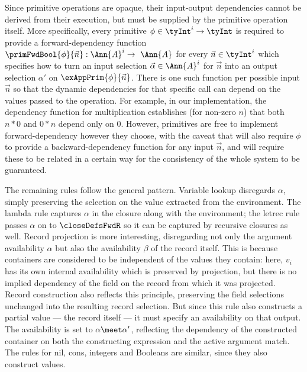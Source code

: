  Since primitive operations are opaque, their input-output dependencies cannot be derived from their execution, but must be supplied by the primitive operation itself. More specifically, every primitive $\phi \in \tyInt^{i} \to \tyInt$ is required to provide a forward-dependency function $\primFwdBool{\phi}{\vec{n}}: \Ann{A}^i \to \Ann{A}$ for every $\vec{n} \in \tyInt^i$ which specifies how to turn an input selection $\vec{\alpha} \in \Ann{A}^i$ for $\vec{n}$ into an output selection $\alpha'$ on $\exAppPrim{\phi}{\vec{n}}$. There is one such function per possible input $\vec{n}$ so that the dynamic dependencies for that specific call can depend on the values passed to the operation. For example, in our implementation, the dependency function for multiplication establishes (for non-zero $n$) that both $n * 0$ and $0 * n$ depend only on $0$. However, primitives are free to implement forward-dependency however they choose, with the caveat that  will also require $\phi$ to provide a backward-dependency function for any input $\vec{n}$, and  will require these to be related in a certain way for the consistency of the whole system to be guaranteed.

 The remaining rules follow the general pattern. Variable lookup disregards $\alpha$, simply preserving the selection on the value extracted from the environment. The lambda rule captures $\alpha$ in the closure along with the environment; the letrec rule passes $\alpha$ on to $\closeDefsFwdR$ so it can be captured by recursive closures as well. Record projection is more interesting, disregarding not only the argument availability $\alpha$ but also the availability $\beta$ of the record itself. This is because containers are considered to be independent of the values they contain: here, $v_i$ has its own internal availability which is preserved by projection, but there is no implied dependency of the field on the record from which it was projected. Record construction also reflects this principle, preserving the field selections unchanged into the resulting record selection. But since this rule also constructs a partial value --- the record itself --- it must specify an availability on that output. The availability is set to $\alpha \meet \alpha'$, reflecting the dependency of the constructed container on both the constructing expression and the active argument match. The rules for nil, cons, integers and Booleans are similar, since they also construct values.

